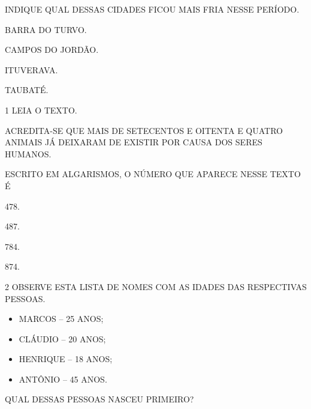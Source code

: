 INDIQUE QUAL DESSAS CIDADES FICOU MAIS FRIA NESSE PERÍODO.

\begin{escolha}
\item BARRA DO TURVO.

\item CAMPOS DO JORDÃO.

\item ITUVERAVA.

\item TAUBATÉ.
\end{escolha}

\pagebreak





\num{1} LEIA O TEXTO.

\begin{myquote}
ACREDITA-SE QUE MAIS DE SETECENTOS E OITENTA E QUATRO ANIMAIS JÁ
DEIXARAM DE EXISTIR POR CAUSA DOS SERES HUMANOS.
\end{myquote}

ESCRITO EM ALGARISMOS, O NÚMERO QUE APARECE NESSE TEXTO É

\begin{escolha}
\item 478.

\item 487.

\item 784.

\item 874.
\end{escolha}

\num{2} OBSERVE ESTA LISTA DE NOMES COM AS IDADES DAS RESPECTIVAS PESSOAS.

\begin{myquote}
\begin{itemize}
  \item MARCOS -- 25 ANOS;
  \item CLÁUDIO -- 20 ANOS;
  \item HENRIQUE -- 18 ANOS;
  \item ANTÔNIO -- 45 ANOS.
\end{itemize}
\end{myquote}

QUAL DESSAS PESSOAS NASCEU PRIMEIRO?

